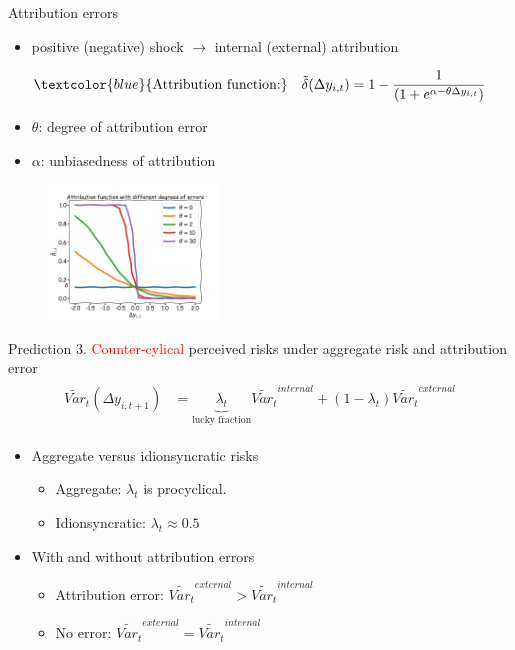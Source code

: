 \documentclass{beamer}
\begin{document}
\begin{frame}{Attribution errors}
	\begin{itemize}
		\item positive (negative) shock $\rightarrow$ internal (external) attribution
	\end{itemize}
	\begin{eqnarray}
		\begin{split}
			\textcolor{blue}{\text{Attribution function:}} \quad \tilde \delta(\Delta y_{i,t}) = 1- \frac{1}{(1+e^{\alpha-\theta\Delta y_{i,t}})}
		\end{split}
	\end{eqnarray}
	\begin{itemize}
		\item $\theta$: degree of attribution error
		\item $\alpha$: unbiasedness of attribution
	\end{itemize}
	
\begin{figure}
	\centering 
	\label{var_experience_var}
	\includegraphics[width=0.4\textwidth]{figures/theta_corr.jpg}
\end{figure}
\end{frame}

\begin{frame}{Prediction 3. \textcolor{red}{Counter-cylical} perceived risks under aggregate risk and attribution error}
	\begin{eqnarray}
		\begin{split}
			\tilde {Var}_{t}(\Delta y_{i,t+1}) & = \underbrace{\lambda_t}_{\text{lucky fraction}} \tilde{Var_t}^{internal} + (1-\lambda_t) \tilde{Var_t}^{external} 
		\end{split}
	\end{eqnarray}
	\begin{itemize} 
		\item Aggregate  versus idionsyncratic risks
		\begin{itemize}
			\item Aggregate: $\lambda_t$ is procyclical.   
			\item Idionsyncratic: $\lambda_t \approx 0.5$ 
		\end{itemize}
		\item With and without attribution errors
		\begin{itemize}
			\item Attribution error: $\tilde{Var_t}^{external} >\tilde{Var_t}^{internal}$ 
			\item No error: $\tilde{Var_t}^{external} =\tilde{Var_t}^{internal}$
		\end{itemize}
	\end{itemize}
	
\end{frame}
\end{document}
